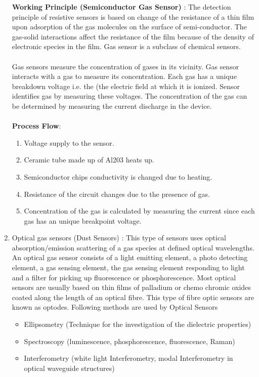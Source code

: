 \begin{enumerate}
	\textbf{Working Principle (Semiconductor Gas Sensor)} : The detection principle of resistive sensors is based on change of the resistance of a thin film upon adsorption of the gas molecules on the surface of semi-conductor. The gas-solid interactions affect the resistance of the film because of the density of electronic species in the film. Gas sensor is a subclass of chemical sensors.
\\
\\
	Gas sensors measure the concentration of gases in its vicinity. Gas sensor interacts with a gas to measure its concentration. Each gas has a unique breakdown voltage i.e. the (the electric field at which it is ionized. Sensor identifies gas by measuring these voltages. The concentration of the gas can be determined by measuring the current discharge in the device.
\\
\\
	\textbf{Process Flow}:
	\begin{enumerate}
		\item Voltage supply to the sensor.
		\item Ceramic tube made up of Al203 heats up.
		\item Semiconductor chips conductivity is changed due to heating.
		\item Resistance of the circuit changes due to the presence of gas.
		\item Concentration of the gas is calculated by measuring the current since each gas has an unique breakpoint voltage. 
	\end{enumerate}

	\item Optical gas sensors (Dust Sensors) : This type of sensors uses optical absorption/emission scattering of a gas species at defined optical wavelengths. An optical gas sensor consists of a light emitting element, a photo detecting element, a gas sensing element, the gas sensing element responding to light and a filter for picking up fluorescence or phosphorescence. Most optical sensors are usually based on thin films of palladium or chemo chromic oxides coated along the length of an optical fibre. This type of fibre optic sensors are known as optodes. Following methods are used by Optical Sensors\\
	
	\begin{itemize}
		\item Ellipsometry (Technique for the investigation of the dielectric properties)
		\item Spectroscopy (luminescence, phosphorescence, fluorescence, Raman)
		\item Interferometry (white light Interferometry, modal Interferometry in optical waveguide structures)
	\end{itemize}


\end{enumerate}
